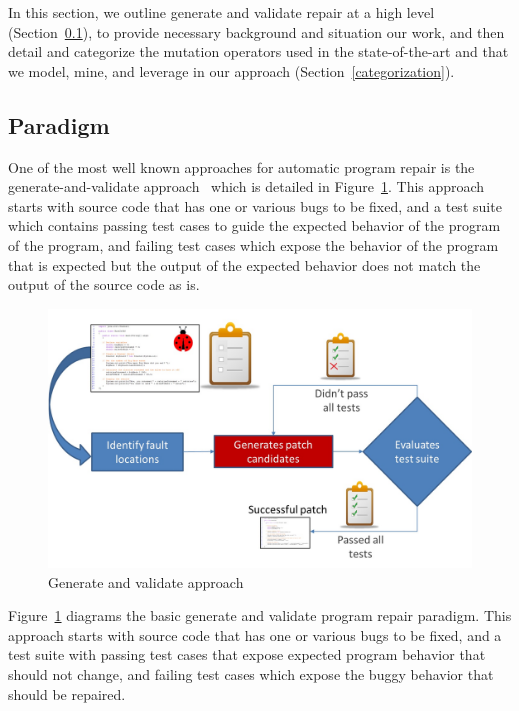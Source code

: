 \documentclass[conference]{IEEEtran}
\begin{document}
In this section, we outline generate and validate repair at a high level
(Section~\ref{sec-paradigm}), to provide necessary background and situation our
work, and then detail and categorize the mutation operators used in the
state-of-the-art and that we model, mine, and leverage in our approach
(Section~\ref{categorization}).  
 
 
\subsection{Paradigm}
\label{sec-paradigm}


One of the most well known approaches for automatic program repair is the
generate-and-validate approach~\cite{legoues12} which is detailed in Figure~\ref{fig:generateandvalidate}. This approach starts with source code that
has one or various bugs to be fixed, and a test suite which contains passing
test cases to guide the expected behavior of the program of the program, and failing test 
cases which expose the behavior of the program that is expected but the output
of the expected behavior does not match the output of the source code as is.

\begin{figure}[!h]
  \centering
    \includegraphics[scale=0.25]{Picture1}
  \caption{Generate and validate approach}
  \label{fig:generateandvalidate}
\end{figure}

Figure~\ref{fig:generateandvalidate} diagrams the basic generate and validate
program repair paradigm. This approach starts with source code that
has one or various bugs to be fixed, and a test suite with passing
test cases that expose expected program behavior that should not change, and failing test 
cases which expose the buggy behavior that should be repaired.  
\end{document}
